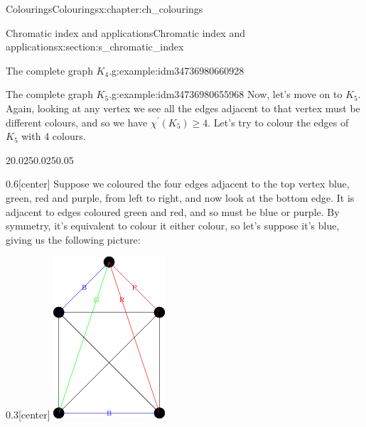 \documentclass[oneside,10pt,]{book}
\numberwithin{equation}{section}
\begin{document}
\begin{chapterptx}{Colourings}{}{Colourings}{}{}{x:chapter:ch_colourings}
\begin{sectionptx}{Chromatic index and applications}{}{Chromatic index and applications}{}{}{x:section:s_chromatic_index}
\begin{example}{The complete graph \(K_4\).}{g:example:idm34736980660928}
\end{example}
\begin{example}{The complete graph \(K_5\).}{g:example:idm34736980655968}%
Now, let's move on to \(K_5\).  Again, looking at any vertex we see all the edges adjacent to that vertex must be different colours, and so we have \(\chi^\prime(K_5)\geq 4\).   Let's try to colour the edges of \(K_5\) with 4 colours.%
\begin{sidebyside}{2}{0.025}{0.025}{0.05}%
\begin{sbspanel}{0.6}[center]%
Suppose we coloured the four edges adjacent to the top vertex blue, green, red and purple, from left to right, and now look at the bottom edge.  It is adjacent to edges coloured green and red, and so must be blue or purple.  By symmetry, it's equivalent to colour it either colour, so let's suppose it's blue, giving us the following picture:%
\end{sbspanel}%
\begin{sbspanel}{0.3}[center]%
\includegraphics[width=\linewidth]{images/K5EdgeColouring1.png}

\end{sbspanel}
\end{sidebyside}
\end{example}
\end{sectionptx}
\end{chapterptx}
\end{document}
